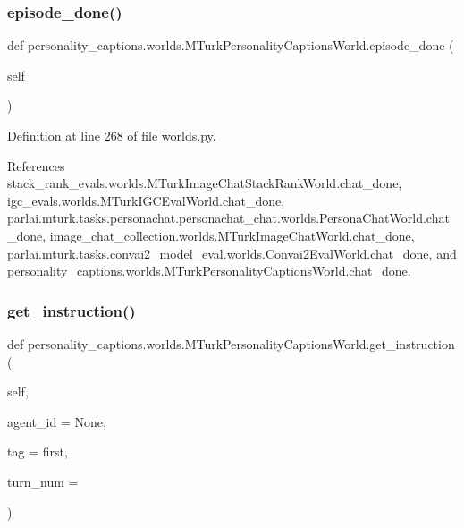 \subsubsection{\texorpdfstring{episode\+\_\+done()}{episode\_done()}}
{\footnotesize\ttfamily def personality\+\_\+captions.\+worlds.\+M\+Turk\+Personality\+Captions\+World.\+episode\+\_\+done (\begin{DoxyParamCaption}\item[{}]{self }\end{DoxyParamCaption})}



Definition at line 268 of file worlds.\+py.



References stack\+\_\+rank\+\_\+evals.\+worlds.\+M\+Turk\+Image\+Chat\+Stack\+Rank\+World.\+chat\+\_\+done, igc\+\_\+evals.\+worlds.\+M\+Turk\+I\+G\+C\+Eval\+World.\+chat\+\_\+done, parlai.\+mturk.\+tasks.\+personachat.\+personachat\+\_\+chat.\+worlds.\+Persona\+Chat\+World.\+chat\+\_\+done, image\+\_\+chat\+\_\+collection.\+worlds.\+M\+Turk\+Image\+Chat\+World.\+chat\+\_\+done, parlai.\+mturk.\+tasks.\+convai2\+\_\+model\+\_\+eval.\+worlds.\+Convai2\+Eval\+World.\+chat\+\_\+done, and personality\+\_\+captions.\+worlds.\+M\+Turk\+Personality\+Captions\+World.\+chat\+\_\+done.

\mbox{\label{classpersonality__captions_1_1worlds_1_1MTurkPersonalityCaptionsWorld_a4e9a57d65cc93af5741f56597a970618}} 
\subsubsection{\texorpdfstring{get\+\_\+instruction()}{get\_instruction()}}
{\footnotesize\ttfamily def personality\+\_\+captions.\+worlds.\+M\+Turk\+Personality\+Captions\+World.\+get\+\_\+instruction (\begin{DoxyParamCaption}\item[{}]{self,  }\item[{}]{agent\+\_\+id = {\ttfamily None},  }\item[{}]{tag = {\ttfamily \textquotesingle{}first\textquotesingle{}},  }\item[{}]{turn\+\_\+num = {} }\end{DoxyParamCaption})}



